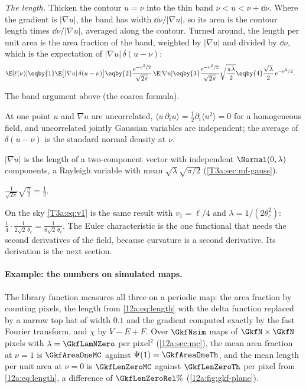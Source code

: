 \emph{The length.} Thicken the contour $u=\nu$ into the thin band $\nu<u<\nu+\dd\nu$. Where the gradient is
$|\nabla u|$, the band has width $\dd\nu/|\nabla u|$, so its area is the contour length times
$\dd\nu/|\nabla u|$, averaged along the contour. Turned around, the length per unit area is the area fraction
of the band, weighted by $|\nabla u|$ and divided by $\dd\nu$, which is the expectation of
$|\nabla u|\,\delta(u-\nu)$:
\begin{align}
  \E[\ell(\nu)]
  &\eqby{1}\E\big[|\nabla u|\,\delta(u-\nu)\big]
   \eqby{2}\frac{e^{-\nu^2/2}}{\sqrt{2\pi}}\,\E|\nabla u|
   \eqby{3}\frac{e^{-\nu^2/2}}{\sqrt{2\pi}}\sqrt{\frac{\pi\lambda}{2}}
   \eqby{4}\frac{\sqrt\lambda}{2}\,e^{-\nu^2/2} .
  \label{12a:eq:length}
\end{align}
\begin{explain}
  \item The band argument above (the coarea formula).
  \item At one point $u$ and $\nabla u$ are uncorrelated, $\langle u\,\partial_iu\rangle=\frac12\partial_i\langle
        u^2\rangle=0$ for a homogeneous field, and uncorrelated jointly Gaussian variables are independent; the
        average of $\delta(u-\nu)$ is the standard normal density at $\nu$.
  \item $|\nabla u|$ is the length of a two-component vector with independent $\Normal(0,\lambda)$ components,
        a Rayleigh variable with mean $\sqrt{\lambda}\sqrt{\pi/2}$ (\cref{T3a:sec:mf-gauss}).
  \item $\frac{1}{\sqrt{2\pi}}\sqrt{\frac{\pi}{2}}=\frac12$.
\end{explain}
On the sky \eqref{T3a:eq:v1} is the same result with $v_1=\ell/4$ and $\lambda=1/(2\theta_c^2)$:
$\frac14\cdot\frac{1}{2\sqrt2\,\theta_c}=\frac{1}{8\sqrt2\,\theta_c}$. The Euler characteristic is the one
functional that needs the second derivatives of the field, because curvature is a second derivative. Its
derivation is the next section.

\paragraph{Example: the numbers on simulated maps.} The library function 
measures all three on a periodic map: the area fraction by counting pixels, the
length from \eqref{12a:eq:length} with the delta function replaced by a narrow top hat of width $0.1$ and the
gradient computed exactly by the fast Fourier transform, and $\chi$ by $V-E+F$. Over $\GkfNsim$ maps of
$\GkfN\times\GkfN$ pixels with $\lambda=\GkfLamNZero$ per pixel$^2$ (\cref{12a:sec:mc}), the mean area fraction
at $\nu=1$ is $\GkfAreaOneMC$ against $\Psi(1)=\GkfAreaOneTh$, and the mean length per unit area at $\nu=0$ is
$\GkfLenZeroMC$ against $\GkfLenZeroTh$ per pixel from \eqref{12a:eq:length}, a difference of
$\GkfLenZeroRel\%$ (\cref{12a:fig:gkf-plane}).

